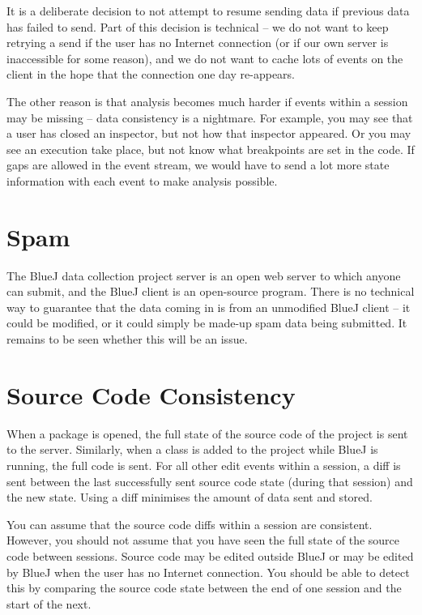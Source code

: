 \documentclass{report}
\begin{document}
It is a deliberate decision to not attempt to resume sending data if previous
data has failed to send.  Part of this decision is technical -- we do not want
to keep retrying a send if the user has no Internet connection (or if our own
server is inaccessible for some reason), and we do not want to cache lots of
events on the client in the hope that the connection one day re-appears.

The other reason is that analysis becomes much harder if events within a session
may be missing -- data consistency is a nightmare.  For example, you may see
that a user has closed an inspector, but not how that inspector appeared.  Or
you may see an execution take place, but not know what breakpoints are set in
the code.  If gaps are allowed in the event stream, we would have to send a
lot more state information with each event to make analysis possible.

\section{Spam}
\label{def:spam}

The BlueJ data collection project server is an open web server to which anyone
can submit, and the BlueJ client is an open-source program.  There is no
technical way to guarantee that the data coming in is from an unmodified BlueJ
client -- it could be modified, or it could simply be made-up spam data being
submitted.  It remains to be seen whether this will be an issue.

\section{Source Code Consistency}

When a package is opened, the full state of the source code of the project is
sent to the server.  Similarly, when a class is added to the project while
BlueJ is running, the full code is sent.  For all other edit events within a session, a diff is sent
between the last successfully sent source code state (during that session) and
the new state.  Using a diff minimises the amount of data sent and stored.

You can assume that the source code diffs within a session are consistent.
However, you should not assume that you have seen the full state of the source
code between sessions.  Source code may be edited outside BlueJ or may be edited
by BlueJ when the user has no Internet connection.  You should be able to
detect this by comparing the source code state between the end of one session
and the start of the next.
\end{document}
